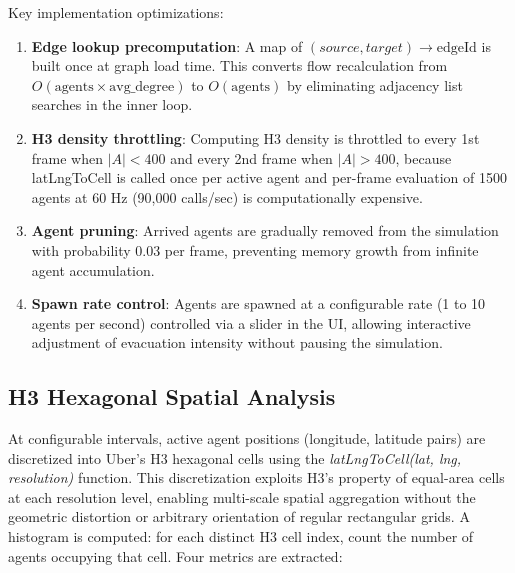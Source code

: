 \documentclass[conference]{IEEEtran}
\begin{document}
Key implementation optimizations:

\begin{enumerate}
\item \textbf{Edge lookup precomputation}: A map of $(source, target) \to \text{edgeId}$ is built once at graph load time. This converts flow recalculation from $O(\text{agents} \times \text{avg\_degree})$ to $O(\text{agents})$ by eliminating adjacency list searches in the inner loop.

\item \textbf{H3 density throttling}: Computing H3 density is throttled to every 1st frame when $|A| < 400$ and every 2nd frame when $|A| > 400$, because latLngToCell is called once per active agent and per-frame evaluation of 1500 agents at 60 Hz (90,000 calls/sec) is computationally expensive.

\item \textbf{Agent pruning}: Arrived agents are gradually removed from the simulation with probability 0.03 per frame, preventing memory growth from infinite agent accumulation.

\item \textbf{Spawn rate control}: Agents are spawned at a configurable rate (1 to 10 agents per second) controlled via a slider in the UI, allowing interactive adjustment of evacuation intensity without pausing the simulation.
\end{enumerate}

\subsection{H3 Hexagonal Spatial Analysis}

At configurable intervals, active agent positions (longitude, latitude pairs) are discretized into Uber's H3 hexagonal cells using the \textit{latLngToCell(lat, lng, resolution)} function. This discretization exploits H3's property of equal-area cells at each resolution level, enabling multi-scale spatial aggregation without the geometric distortion or arbitrary orientation of regular rectangular grids. A histogram is computed: for each distinct H3 cell index, count the number of agents occupying that cell. Four metrics are extracted:
\end{document}
